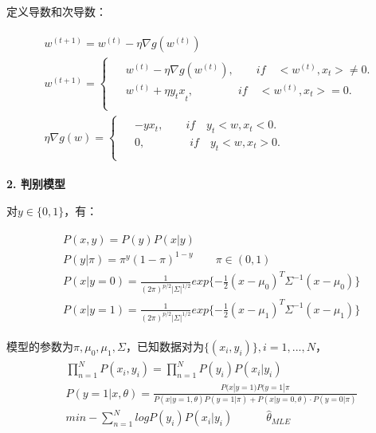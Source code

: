 \documentclass[12pt,UTF8,AutoFakeBold]{article}
\begin{document}
定义导数和次导数：

\begin{gather}
\begin{aligned}
& { w }^{ (t+1) }={ w }^{ (t) }-\eta \nabla g({ w }^{ (t) })\\ 
& { w }^{ (t+1) }=\left\{
\begin{aligned}
             \begin{aligned}  
             &{ w }^{ (t) }-\eta \nabla g({ w }^{ (t) }),\quad \quad if\quad <{ w }^{ (t) },{ x }_{ t }>\neq 0.  \\  
             &{ w }^{ (t) }+\eta { { y }_{ t }x }_{ t },\quad \quad \quad \quad if\quad <{ w }^{ (t) },{ x }_{ t }>=0.\\ 
             \end{aligned}  
\end{aligned}
\right.\\
& \eta \nabla g({ w })=\left\{
\begin{aligned}
             \begin{aligned}  
             &-yx_t,\quad \quad if\quad y_t<w ,{ x }_{ t }< 0.  \\  
             &0,\quad \quad \quad \quad if\quad y_t<w ,{ x }_{ t }> 0.\\ 
             \end{aligned}  
\end{aligned}
\right.
\end{aligned}
\end{gather}

\textbf{2. 判别模型}

对$y\in \{0,1\}$，有：

\begin{gather}
\begin{aligned}
& P(x,y)=P(y)P(x|y)\\ 
& P(y|\pi )={ \pi  }^{ y }{ (1-\pi ) }^{ 1-y }\quad \quad \pi \in (0,1)\\ 
& P(x|y=0)=\frac { 1 }{ { (2\pi ) }^{ p/2 }{ \left| \Sigma  \right|  }^{ 1/2 } } exp\{ -\frac { 1 }{ 2 } { (x-{ \mu  }_{ 0 }) }^{ T }{ \Sigma  }^{ -1 }{ (x-{ \mu  }_{ 0 }) }\} \\ 
& P(x|y=1)=\frac { 1 }{ { (2\pi ) }^{ p/2 }{ \left| \Sigma  \right|  }^{ 1/2 } } exp\{ -\frac { 1 }{ 2 } { (x-{ \mu  }_{ 1 }) }^{ T }{ \Sigma  }^{ -1 }{ (x-{ \mu  }_{ 1 }) }\}
\end{aligned}
\end{gather}

模型的参数为$\pi, {\mu}_0, {\mu}_1, \Sigma $，已知数据对为$\{(x_i,y_i)\},i=1,...,N$，
\begin{gather}
\begin{aligned}
& \prod _{ n=1 }^{ N }{ P({ x }_{ i },{ y }_{ i })=\prod _{ n=1 }^{ N }{ P({ y }_{ i }) }  } P({ x }_{ i }|{ y }_{ i })\\
&P(y=1|x,\theta)=\frac{P(x|y=1)P(y=1|\pi}{P(x|y=1,\theta )P(y=1|\pi)+P(x|y=0,\theta )\cdot P(y=0|\pi)} \\
& min-\sum _{ n=1 }^{ N }{ log } P({ y }_{ i })P({ x }_{ i }|{ y }_{ i })\quad \quad \quad { \hat { \theta  }  }_{ MLE }
\end{aligned}
\end{gather}
\end{document}
